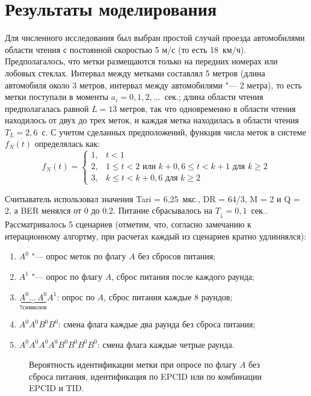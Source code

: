 \section{Результаты моделирования}
Для численного исследования был выбран простой случай проезда автомобилями области чтения с постоянной скоростью 5 м/с (то есть 18~км/ч). Предполагалось, что метки размещаются только на передних номерах или лобовых стеклах. Интервал между метками составлял 5 метров (длина автомобиля около 3 метров, интервал между автомобилями "--- 2 метра), то есть метки поступали в моменты $a_i = 0, 1, 2, \dots$~сек.; длина области чтения предполагалась равной $L=13$ метров, так что одновременно в области чтения находилось от двух до трех меток, и каждая метка находилась в области чтения $T_L = 2,6$~с. С учетом сделанных предположений, функция числа меток в системе $f_N(t)$ определялась как:
$$
	f_N(t) = \begin{cases}
		1, &t < 1\\
		2, &1 \leqslant t < 2 \text{ или } k + 0,6 \leqslant t < k+1 \text{ для } k \geqslant 2 \\
		3, &k \leqslant t < k + 0,6 \text{ для } k \geqslant 2
	\end{cases}
$$

Считыватель использовал значения Tari = 6,25~мкс., DR = 64/3, M = 2 и Q = 2, а BER менялся от 0 до 0.2. Питание сбрасывалось на $T_{\downarrow} = 0,1$~сек.. Рассматривалось 5 сценариев (отметим, что, согласно замечанию к итерационному алгортму, при расчетах каждый из сценариев кратно удлиннялся):
\begin{enumerate}
	\item $A^0$ "--- опрос меток по флагу $A$ без сбросов питания;
	\item $A^1$ "--- опрос по флагу $A$, сброс питания после каждого раунда;
	\item $\underbrace{A^0 \dots\, A^0}_{7 символов} A^1$: опрос по $A$, сброс питания каждые 8 раундов;
	\item $A^0 A^0 B^0 B^0$: смена флага каждые два раунда без сброса питания;
	\item $A^0 A^0 A^0 A^0 B^0 B^0 B^0 B^0$: смена флага каждые четрые раунда.
\end{enumerate}

\begin{figure}[htb]
  \caption{Вероятность идентификации метки при опросе по флагу $A$ без сброса питания, идентификация по EPCID или по комбинации EPCID и TID.}
  \label{fig:ch3_plot_base}
\end{figure}

